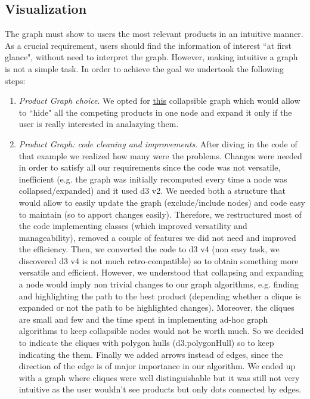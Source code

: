 \documentclass[a4paper,12pt]{article}
\begin{document}
\subsection{Visualization}
The graph must show to users the most relevant products in an intuitive manner. As a crucial requirement, users should find the information of interest ``at first glance", without need to interpret the graph. However, making intuitive a graph is not a simple task. In order to achieve the goal we undertook the following steps:
\begin{enumerate}
	\item \textit{Product Graph choice}. We opted for \href{http://bl.ocks.org/GerHobbelt/3071239}{this} collapsible graph which would allow to ``hide" all the competing products in one node and expand it only if the user is really interested in analazying them. 

	\item \textit{Product Graph: code cleaning and improvements}. After diving in the code of that example we realized how many were the problems. Changes were needed in order to satisfy all our requirements since the code was not versatile, inefficient (e.g. the graph was initially recomputed every time a node was collapsed/expanded) and it used d3 v2. We needed both a structure that would allow to easily update the graph (exclude/include nodes) and code easy to maintain (so to apport changes easily). Therefore, we restructured most of the code implementing classes (which improved versatility and manageability), removed a couple of features we did not need and improved the efficiency. Then, we converted the code to d3 v4 (non easy task, we discovered d3 v4 is not much retro-compatible) so to obtain something more versatile and efficient. However, we understood that collapsing and expanding a node would imply non trivial changes to our graph algorithms, e.g. finding and highlighting the path to the best product (depending whether a clique is expanded or not the path to be highlighted changes). Moreover, the cliques are small and few and the time spent in implementing ad-hoc graph algorithms to keep collapsible nodes would not be worth much. So we decided to indicate the cliques with polygon hulls (d3.polygonHull) so to keep indicating the them. Finally we added arrows instead of edges, since the direction of the edge is of major importance in our algorithm.  We ended up with a graph where cliques were well distinguishable but it was still not very intuitive as the user wouldn't see products but only dots connected by edges.


\end{enumerate}
\end{document}
